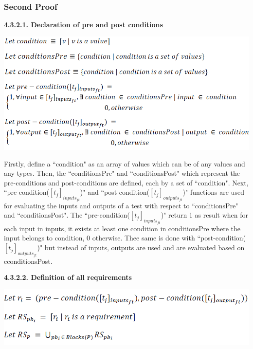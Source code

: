 \documentclass[conference,compsoc]{IEEEtran}
\begin{document}
\subsubsection{Second Proof}

\noindent
\newline\newline
\textbf{4.3.2.1. Declaration of pre and post conditions}
\begin{center}
\includegraphics[scale=0.4]{Proof2-Part1.png} 
\end{center}

Firstly, define a ``condition" as an array of values which can be of any values and any types. Then, the ``conditionsPre" and ``conditionsPost" which represent the pre-conditions and post-conditions are defined, each by a set of ``condition".  Next, ``pre-condition($[t_{j}]_{inputs_{ft}}$)" and ``post-condition($[t_{j}]_{outputs_{ft}}$)" functions are used for evaluating the inputs and outputs of a test with respect to ``conditionsPre" and ``conditionsPost". The ``pre-condition($[t_{j}]_{inputs_{ft}}$)" return 1 as result when for each input in inputs, it exists at least one condition in conditionsPre where the input belongs to condition, 0 otherwise. Thee same is done with ``post-condition($[t_{j}]_{outputs_{ft}}$)" but instead of inputs, outputs are used and are evaluated based on cconditionsPost.  

\noindent
\newline\newline\newline\newline\newline\newline\newline
\textbf{4.3.2.2. Definition of all requirements}
\begin{center}
\includegraphics[scale=0.5]{Proof2-Part2.png} 
\end{center}
\end{document}
